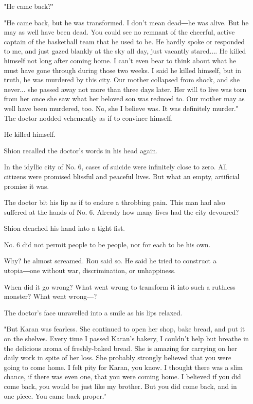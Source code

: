 "He came back?"

"He came back, but he was transformed. I don't mean dead―he was alive.
But he may as well have been dead. You could see no remnant of the
cheerful, active captain of the basketball team that he used to be. He
hardly spoke or responded to me, and just gazed blankly at the sky all
day, just vacantly stared.... He killed himself not long after coming
home. I can't even bear to think about what he must have gone through
during those two weeks. I said he killed himself, but in truth, he was
murdered by this city. Our mother collapsed from shock, and she never...
she passed away not more than three days later. Her will to live was
torn from her once she saw what her beloved son was reduced to. Our
mother may as well have been murdered, too. No, she I believe was. It
was definitely murder." The doctor nodded vehemently as if to convince
himself.

He killed himself.

Shion recalled the doctor's words in his head again.

In the idyllic city of No. 6, cases of suicide were infinitely close to
zero. All citizens were promised blissful and peaceful lives. But what
an empty, artificial promise it was.

The doctor bit his lip as if to endure a throbbing pain. This man had
also suffered at the hands of No. 6. Already how many lives had the city
devoured?

Shion clenched his hand into a tight fist.

No. 6 did not permit people to be people, nor for each to be his own.

Why? he almost screamed. Rou said so. He said he tried to construct a
utopia―one without war, discrimination, or unhappiness.

When did it go wrong? What went wrong to transform it into such a
ruthless monster? What went wrong―?

The doctor's face unravelled into a smile as his lips relaxed.

"But Karan was fearless. She continued to open her shop, bake bread, and
put it on the shelves. Every time I passed Karan's bakery, I couldn't
help but breathe in the delicious aroma of freshly-baked bread. She is
amazing for carrying on her daily work in spite of her loss. She
probably strongly believed that you were going to come home. I felt pity
for Karan, you know. I thought there was a slim chance, if there was
even one, that you were coming home. I believed if you did come back,
you would be just like my brother. But you did come back, and in one
piece. You came back proper."

